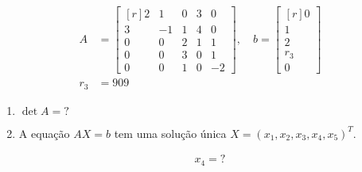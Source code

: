 \grupo{}

\begin{align*}
	A &=
	\begin{bmatrix*}[r]
		2 & 1 & 0 & 3 & 0\\
		3 & -1 & 1 & 4 & 0\\
		0 & 0 & 2 & 1 & 1\\
		0 & 0 & 3 & 0 & 1\\
		0 & 0 & 1 & 0 & -2
	\end{bmatrix*},
	\quad
	b =
	\begin{bmatrix*}[r]
		0\\
		1\\
		2\\
		r_3\\
		0
	\end{bmatrix*}\\
	r_3 &= 909
\end{align*}


\begin{enumerate}[label=\alph*.]
	\item $\det A = ?$
	\item\hfill
		\begin{proposition}
			A equação $AX = b$ tem uma solução única
			$X = (x_1, x_2, x_3, x_4, x_5)^T$.
		\end{proposition}
		\begin{align*}
			x_4 = ?
		\end{align*}
\end{enumerate}
